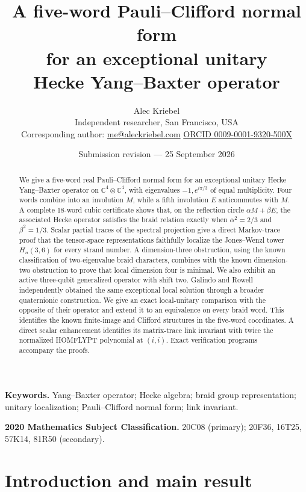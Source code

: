 \documentclass[11pt]{article}
\title{\vspace{-1.4cm}\textbf{A five-word Pauli--Clifford normal form}\\[0.2em]
\textbf{for an exceptional unitary}\\[0.2em]
\textbf{Hecke Yang--Baxter operator}}
\author{Alec Kriebel\\[-0.1em]
\small Independent researcher, San Francisco, USA\\[-0.1em]
\small Corresponding author: \href{mailto:me@aleckriebel.com}{me@aleckriebel.com}
\quad\textperiodcentered\quad
\href{https://orcid.org/0009-0001-9320-500X}{ORCID 0009-0001-9320-500X}}
\date{Submission revision --- 25 September 2026}
\theoremstyle{remark}
\newcommand{\bbC}{\mathbb C}
\begin{document}
\maketitle

\begin{abstract}
We give a five-word real Pauli--Clifford normal form for an exceptional unitary
Hecke Yang--Baxter operator on \(\bbC^4\otimes\bbC^4\), with eigenvalues
\(-1,e^{i\pi/3}\) of equal multiplicity.  Four words combine into an involution
\(M\), while a fifth involution \(E\) anticommutes with \(M\).  A complete
\(18\)-word cubic certificate shows that, on the reflection circle
\(\alpha M+\beta E\), the associated Hecke operator satisfies the braid relation exactly when
\(\alpha^2=2/3\) and \(\beta^2=1/3\).  Scalar partial traces of the spectral
projection give a direct Markov-trace proof that the tensor-space
representations faithfully localize the Jones--Wenzl tower \(H_n(3,6)\) for
every strand number.  A dimension-three obstruction, using the known
classification of two-eigenvalue braid characters, combines with the known
dimension-two obstruction to prove that local dimension four is minimal.
We also exhibit an active three-qubit generalized operator with shift two.
Galindo and Rowell independently obtained the same exceptional local solution
through a broader quaternionic construction.  We give an exact local-unitary
comparison with the opposite of their operator and extend it to an
equivalence on every braid word.  This identifies the known finite-image and
Clifford structures in the five-word coordinates.  A direct scalar enhancement
identifies its matrix-trace link invariant with twice the normalized HOMFLYPT
polynomial at \((i,i)\).  Exact verification programs accompany the proofs.
\end{abstract}

\medskip
\noindent\textbf{Keywords.}
Yang--Baxter operator; Hecke algebra; braid group representation; unitary
localization; Pauli--Clifford normal form; link invariant.

\smallskip
\noindent\textbf{2020 Mathematics Subject Classification.}
20C08 (primary); 20F36, 16T25, 57K14, 81R50 (secondary).

\section{Introduction and main result}
\end{document}
